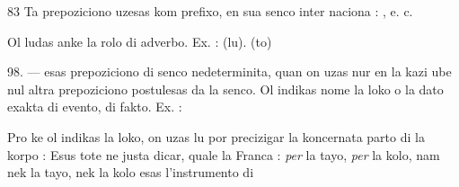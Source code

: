 \begin{VUpage}[87]{83}
Ta prepoziciono uzesas kom prefixo, en sua senco inter\cc
naciona : \nl
{}, e. c.

Ol ludas anke la rolo di adverbo. Ex. : \cc
{} (lu). \nl
{} (to) 

\VUblanc{5.95pt}%
98. ---  esas prepoziciono di senco nedeterminita,\nl
quan on uzas nur en la kazi ube nul altra prepoziciono\nl
postulesas da la senco. Ol indikas nome la loko o la dato\nl
exakta di evento, di fakto. Ex. : \nl
{}

Pro ke ol indikas la loko, on uzas lu por precizigar la\nl
koncernata parto di la korpo : \nl
{}\nl
Esus tote ne justa dicar, quale la Franca : \textit{per} la tayo, \textit{per}\nl
la kolo, nam nek la tayo, nek la kolo esas l'instrumento di\parplein
\end{VUpage}


